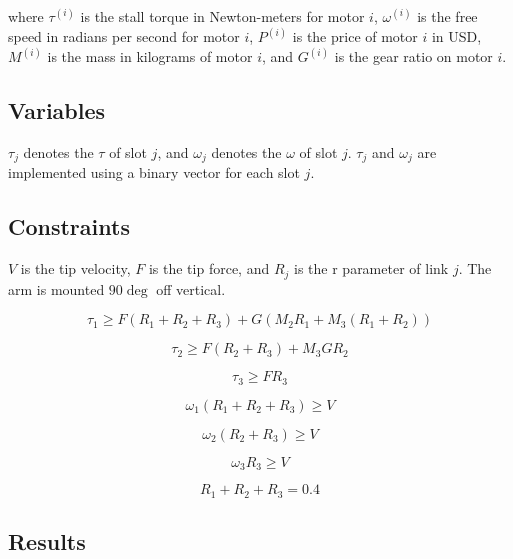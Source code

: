 \documentclass{article}
\begin{document}
where $\tau^{(i)}$ is the stall torque in Newton-meters for motor $i$,
$\omega^{(i)}$ is the free speed in radians per second for motor $i$, $P^{(i)}$
is the price of motor $i$ in USD, $M^{(i)}$ is the mass in kilograms of motor
$i$, and $G^{(i)}$ is the gear ratio on motor $i$.

\FloatBarrier{}
\subsection{Variables}

$\tau_j$ denotes the $\tau$ of slot $j$, and $\omega_j$ denotes the $\omega$ of
slot $j$. $\tau_j$ and $\omega_j$ are implemented using a binary vector for
each slot $j$.

\FloatBarrier{}
\subsection{Constraints}

$V$ is the tip velocity, $F$ is the tip force, and $R_j$ is the r parameter of
link $j$. The arm is mounted $90 \deg$ off vertical.

\begin{equation}
    \tau_{1} \geq F(R_1 + R_2 + R_3) + G (M_2 R_1 + M_3 (R_1 + R_2))
\end{equation}

\begin{equation}
    \tau_{2} \geq F(R_2 + R_3) + M_3 G R_2
\end{equation}

\begin{equation}
    \tau_{3} \geq F R_3
\end{equation}

\begin{equation}
    \omega_{1} (R_1 + R_2 + R_3)\geq V
\end{equation}

\begin{equation}
    \omega_{2} (R_2 + R_3) \geq V
\end{equation}

\begin{equation}
    \omega_{3} R_3 \geq V
\end{equation}

\begin{equation}
    R_1 + R_2 + R_3 = 0.4
\end{equation}

\FloatBarrier{}
\subsection{Results}
\end{document}
